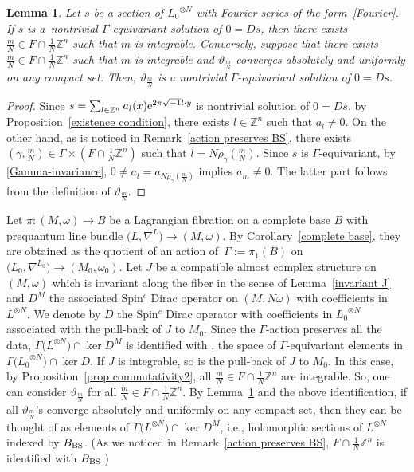 \documentclass[pdftex]{sigma}
\numberwithin{equation}{section}
\newtheorem{Lemma}[Theorem]{Lemma}
\newcommand{\Z}{\mathbb{Z}}
\begin{document}
\begin{Lemma}\label{existence condition2}
Let $s$ be a section of ${L_0}^{\otimes N}$ with Fourier series of the form~\eqref{Fourier}. If $s$ is a~nontrivial $\Gamma$-equivariant solution of $0=Ds$, then there exists $\frac{m}{N}\in F\cap \frac{1}{N}\Z^n$ such that $m$ is integrable. Conversely, suppose that there exists ${\frac{m}{N}\in F\cap \frac{1}{N}\Z^n}$
such that $m$ is integrable
and $\vartheta_{\frac{m}{N}}$ converges absolutely and uniformly on any compact set. Then, $\vartheta_{\frac{m}{N}}$ is a nontrivial $\Gamma$-equivariant solution of $0=Ds$.
\end{Lemma}
\begin{proof}
Since $s=\sum_{l\in \Z^n}a_l(x){\rm e}^{2\pi\sqrt{-1}l\cdot y}$ is nontrivial solution of $0=Ds$, by Proposition~\ref{existence condition}, there exists $l\in \Z^n$ such that $a_l\not=0$. On the other hand, as is noticed in Remark~\ref{action preserves BS}, there exists $\left(\gamma ,\frac{m}{N}\right)\in \Gamma\times \left(F\cap \frac{1}{N}\Z^n\right)$ such that $l=N\rho_\gamma(\frac{m}{N})$. Since $s$ is $\Gamma$-equivariant, by \eqref{Gamma-invariance}, $0\not=a_l=a_{N\rho_\gamma(\frac{m}{N})}$ implies $a_m\not=0$.
%
The latter part follows from the definition of $\vartheta_{\frac{m}{N}}$.
\end{proof}

Let $\pi\colon (M,\omega)\to B$ be a Lagrangian fibration on a complete base $B$ with prequantum line bundle $\bigl(L,\nabla^L\bigr)\to (M,\omega)$. By Corollary~\ref{complete base}, they
are obtained as the quotient of an action of~${\Gamma:=\pi_1(B)}$ on $\bigl({L_0},\nabla^{L_0}\bigr)\to (M_0,\omega_0)$. Let $J$ be a compatible almost complex structure on~$(M,\omega)$ which is invariant along the fiber in the sense of Lemma~\ref{invariant J} and $D^M$ the associated Spin${}^c$ Dirac operator on $(M,N\omega)$ with coefficients in $L^{\otimes N}$. We denote by $D$ the Spin${}^c$ Dirac operator with coefficients in ${L_0}^{\otimes N}$ associated with the pull-back of $J$ to $M_0$. Since the $\Gamma$-action preserves all the data, $\Gamma \bigl(L^{\otimes N}\bigr)\cap \ker D^M$ is identified with , the space of $\Gamma$-equivariant elements in $\Gamma \bigl({L_0}^{\otimes N}\bigr)\cap \ker D$.
%
If $J$ is integrable, so is the pull-back of $J$ to $M_0$. In this case, by Proposition~\ref{prop commutativity2}, all $\frac{m}{N}\in F\cap \frac{1}{N}\Z^n$ are integrable. So, one can consider $\vartheta_{\frac{m}{N}}$ for all $\frac{m}{N}\in F\cap \frac{1}{N}\Z^n$. By Lemma~\ref{existence condition2} and the above identification, if all $\vartheta_{\frac{m}{N}}$'s converge absolutely and uniformly on any compact set, then they can be thought of as elements of $\Gamma \bigl(L^{\otimes N}\bigr)\cap \ker D^M$, i.e., holomorphic sections of $L^{\otimes N}$ indexed by $B_{\rm BS}$. (As we noticed in Remark~\ref{action preserves BS}, $F\cap \frac{1}{N}\Z^n$ is identified with $B_{\rm BS}$.)
\end{document}
